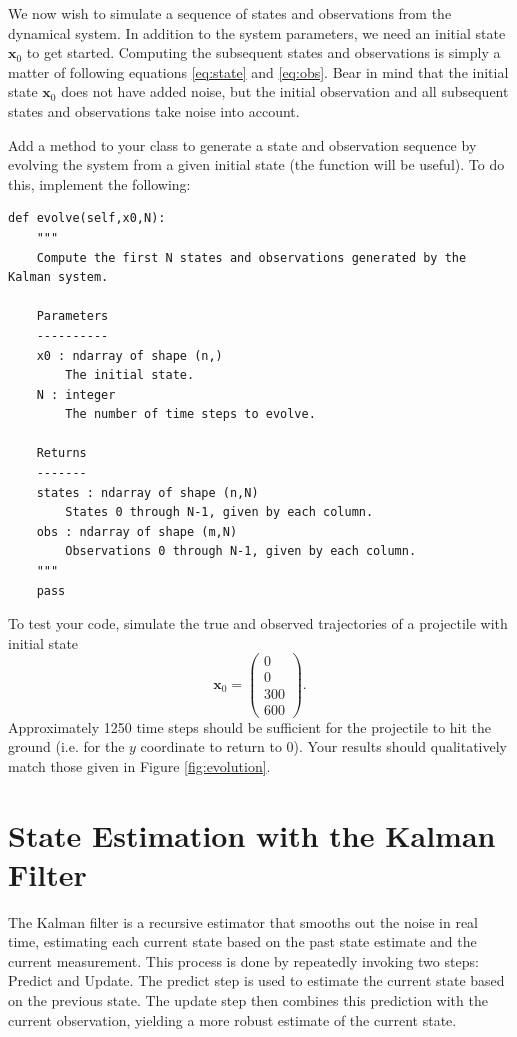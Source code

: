 We now wish to simulate a sequence of states and observations from the dynamical system.
In addition to the system parameters, we need an initial state $\mathbf{x}_0$ to get started.
Computing the subsequent states and observations is simply a matter of following equations \ref{eq:state} and \ref{eq:obs}.
Bear in mind that the initial state $\mathbf{x}_0$ does not have added noise, but the initial observation and all subsequent states and observations take noise into account.

\begin{problem}
Add a method to your  class to generate a state and observation sequence by evolving the system from a given initial state (the function  will be useful).
To do this, implement the following:
\begin{lstlisting}
def evolve(self,x0,N):
    """
    Compute the first N states and observations generated by the Kalman system.

    Parameters
    ----------
    x0 : ndarray of shape (n,)
        The initial state.
    N : integer
        The number of time steps to evolve.

    Returns
    -------
    states : ndarray of shape (n,N)
        States 0 through N-1, given by each column.
    obs : ndarray of shape (m,N)
        Observations 0 through N-1, given by each column.
    """
    pass
\end{lstlisting}

\noindent To test your code, simulate the true and observed trajectories of a projectile with initial state
\begin{equation*}
    \mathbf{x}_0 = \left( \begin{array}{c} 0\\ 0 \\ 300 \\ 600\end{array} \right).
\end{equation*}
Approximately 1250 time steps should be sufficient for the projectile to hit the ground (i.e. for the $y$ coordinate to return to 0).
Your results should qualitatively match those given in Figure \ref{fig:evolution}.
\label{prob:simulation}
\end{problem}



\section*{State Estimation with the Kalman Filter}
The Kalman filter is a recursive estimator that smooths out the noise in real time, estimating each current state based on the past state estimate and the current measurement.
This process is done by repeatedly invoking two steps: Predict and Update.
The predict step is used to estimate the current state based on the previous state.
The update step then combines this prediction with the current observation, yielding a more robust estimate of the current state.

